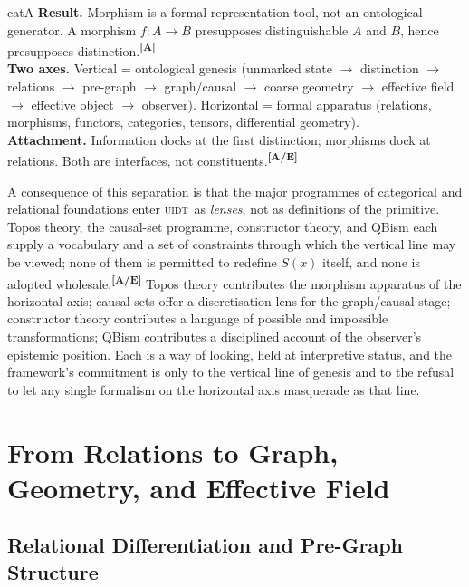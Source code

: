 \documentclass[12pt,a4paper,twoside]{article}
\theoremstyle{plain}
\theoremstyle{definition}
\theoremstyle{remark}
\newcommand{\UIDT}{\textsc{uidt}}
\newcommand{\catmark}[1]{\textsuperscript{\textsf{\textbf{[#1]}}}}
\begin{document}
\begin{evidencebox}{catA}
\textbf{Result.} Morphism is a formal-representation tool, not an ontological generator. A morphism $f\colon A\to B$ presupposes distinguishable $A$ and $B$,
hence presupposes distinction.\catmark{A}\\[0.3em]
\textbf{Two axes.} Vertical = ontological genesis (unmarked state $\to$ distinction $\to$ relations $\to$ pre-graph $\to$ graph/causal $\to$ coarse geometry $\to$ effective field $\to$ effective object $\to$ observer). Horizontal = formal apparatus (relations, morphisms, functors, categories,
tensors, differential geometry).\\[0.3em]
\textbf{Attachment.} Information docks at the first distinction; morphisms dock at relations. Both are interfaces, not constituents.\catmark{A/E}
\end{evidencebox}

\noindent A consequence of this separation is that the major programmes of categorical and relational foundations enter \UIDT\ as \emph{lenses}, not as definitions of the primitive. Topos theory, the causal-set programme, constructor theory, and QBism each supply a vocabulary and a set of constraints through which the vertical line may be viewed; none of them is permitted to redefine $S(x)$ itself, and none is adopted wholesale.\catmark{A/E} Topos theory contributes the morphism apparatus of the horizontal axis; causal sets offer a discretisation lens for the graph/causal stage; constructor theory contributes a language of possible and impossible transformations; QBism contributes a disciplined account of the observer's epistemic position. Each is a way of looking, held at interpretive status, and the framework's commitment is only to the vertical line of genesis and to the refusal to let any single formalism on the horizontal axis masquerade as that line.

\section{From Relations to Graph, Geometry, and Effective Field}
\label{sec:relations-to-field}

\subsection{Relational Differentiation and Pre-Graph Structure}
\label{subsec:relational-differentiation}
\end{document}
